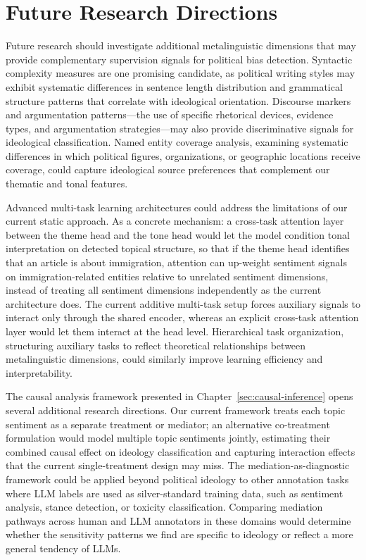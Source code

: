 \section{Future Research Directions}
\label{sec:future-directions}

Future research should investigate additional metalinguistic dimensions that may provide complementary supervision signals for political bias detection. Syntactic complexity measures are one promising candidate, as political writing styles may exhibit systematic differences in sentence length distribution and grammatical structure patterns that correlate with ideological orientation. Discourse markers and argumentation patterns---the use of specific rhetorical devices, evidence types, and argumentation strategies---may also provide discriminative signals for ideological classification. Named entity coverage analysis, examining systematic differences in which political figures, organizations, or geographic locations receive coverage, could capture ideological source preferences that complement our thematic and tonal features.

Advanced multi-task learning architectures could address the limitations of our current static approach. As a concrete mechanism: a cross-task attention layer between the theme head and the tone head would let the model condition tonal interpretation on detected topical structure, so that if the theme head identifies that an article is about immigration, attention can up-weight sentiment signals on immigration-related entities relative to unrelated sentiment dimensions, instead of treating all sentiment dimensions independently as the current architecture does. The current additive multi-task setup forces auxiliary signals to interact only through the shared encoder, whereas an explicit cross-task attention layer would let them interact at the head level. Hierarchical task organization, structuring auxiliary tasks to reflect theoretical relationships between metalinguistic dimensions, could similarly improve learning efficiency and interpretability.

The causal analysis framework presented in Chapter~\ref{sec:causal-inference} opens several additional research directions. Our current framework treats each topic sentiment as a separate treatment or mediator; an alternative co-treatment formulation would model multiple topic sentiments jointly, estimating their combined causal effect on ideology classification and capturing interaction effects that the current single-treatment design may miss. The mediation-as-diagnostic framework could be applied beyond political ideology to other annotation tasks where LLM labels are used as silver-standard training data, such as sentiment analysis, stance detection, or toxicity classification. Comparing mediation pathways across human and LLM annotators in these domains would determine whether the sensitivity patterns we find are specific to ideology or reflect a more general tendency of LLMs.

